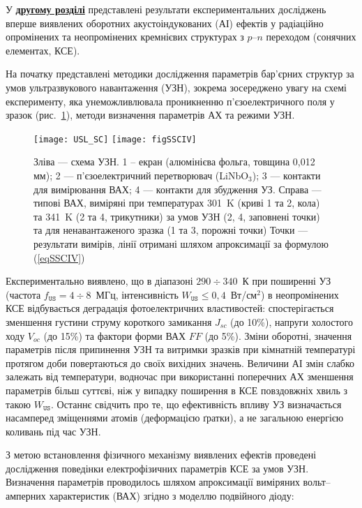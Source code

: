 У  \underline{\textbf{другому розділі}} представлені результати експериментальних досліджень вперше виявлених оборотних акустоіндукованих (АІ) ефектів у радіаційно опромінених та неопромінених кремнієвих структурах з  $p$--$n$ переходом (сонячних елементах, КСЕ).

На початку представлені методики дослідження параметрів бар'єрних структур за умов ультразвукового навантаження (УЗН),
зокрема зосереджено увагу на схемі експерименту, яка унеможливлювала проникненню п'єзоелектричного поля у зразок (рис.~\ref{USL_SC}), методи визначення параметрів АХ та режими УЗН.


\begin{figure}[ht]
\center
\texttt{[image: USL\_SC]} \hfill
\texttt{[image: figSSCIV]}
\caption{\label{USL_SC}
Зліва --- схема УЗН.
1 --  екран (алюмінієва фольга, товщина 0,012 мм);
2 --- п'єзоелектричний перетворювач (LiNbO$_3$);
3 --- контакти для вимірювання ВАХ;
4 --- контакти для збудження УЗ.
Справа --- типові ВАХ, виміряні при температурах 301~K (криві 1 та 2, кола) та 341~K (2 та 4, трикутники)
за умов УЗН (2, 4, заповнені точки) та для ненавантаженого зразка (1 та 3, порожні точки)
Точки --- результати вимірів, лінії отримані шляхом апроксимації за формулою (\ref{eqSSCIV})
}%
\end{figure}

Експериментально виявлено, що в діапазоні $290\div340$~К при поширенні УЗ (частота $f_\mathtt{US}=4\div8$~МГц, інтенсивність $W_\mathtt{US}\leq0,4$~Вт/см$^2$) в неопромінених КСЕ відбувається деградація
фотоелектричних властивостей:
спостерігається зменшення густини струму короткого замикання $J_{sc}$ (до 10\%), напруги холостого ходу $V_{oc}$ (до 15\%) та фактори форми ВАХ $F\!F$ (до 5\%).
Зміни оборотні, значення параметрів  після припинення УЗН  та витримки зразків при кімнатній температурі протягом доби повертаються до своїх вихідних значень.
Величини АІ змін слабко залежать від температури, водночас при використанні поперечних АХ зменшення параметрів більш суттєві, ніж у випадку поширення в КСЕ повздовжніх хвиль з такою  $W_\mathtt{US}$.
Останнє свідчить про те, що ефективність впливу УЗ визначається насамперед зміщеннями атомів (деформацією ґратки), а не загальною енергією коливань під час УЗН.


З метою встановлення фізичного механізму виявлених ефектів проведені дослідження поведінки електрофізичних параметрів КСЕ за умов УЗН.
Визначення параметрів проводилось шляхом апроксимації виміряних вольт--амперних характеристик (ВАХ) згідно з моделлю подвійного діоду:

